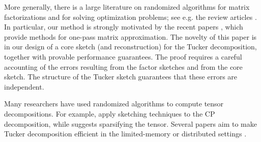More generally, there is a large literature on randomized algorithms
for matrix factorizations and for solving optimization problems;
see e.g. the review articles \cite{halko2011finding, woodruff2014sketching}.
In particular, our method is strongly motivated by the recent papers \cite{tropp2018more, tropp2019streaming},
which provide methods for one-pass matrix approximation.
The novelty of this paper is in our design of a core sketch (and reconstruction) for
the Tucker decomposition,
together with provable performance guarantees.
The proof requires a careful accounting of the errors resulting from
the factor sketches and from the core sketch.
The structure of the Tucker sketch guarantees that these errors are independent.

Many researchers have used randomized algorithms to compute tensor decompositions.
For example, \cite{wang2015fast, battaglino2018practical} apply sketching techniques to the CP decomposition,
while \cite{tsourakakis2010mach} suggests sparsifying the tensor. Several papers aim to make Tucker decomposition efficient in the limited-memory or distributed settings \cite{baskaran2012efficient, zhou2014decomposition,
austin2016parallel, kaya2016high, li2015input, battaglino2019faster}.

